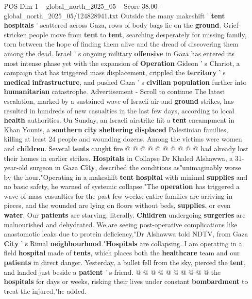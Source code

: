 \begin{textsample}{POS Dim 1 – global\_north\_2025\_05 – Score 38.00 – global\_north\_2025\_05/124828941.txt}  \label{ex:f1_pos_212}
Outside the many makeshift ' \textbf{tent} \textbf{hospitals} ' scattered across Gaza, rows of body bags lie on the \textbf{ground}.
Grief-stricken people move from \textbf{tent} to \textbf{tent}, searching desperately for missing family, torn between the hope of finding them alive and the dread of discovering them among the dead.
Israel ' s ongoing military \textbf{offensive} in Gaza has entered its most intense phase yet with the expansion of \textbf{Operation} Gideon ' s Chariot, a campaign that has triggered mass displacement, crippled the \textbf{territory} ' s \textbf{medical} \textbf{infrastructure}, and pushed Gaza ' s \textbf{civilian} \textbf{population} further into \textbf{humanitarian} catastrophe.
Advertisement - Scroll to continue The latest escalation, marked by a sustained wave of Israeli air and \textbf{ground} strikes, has resulted in hundreds of new casualties in the last few days, according to local \textbf{health} authorities.
On Sunday, an Israeli airstrike hit a \textbf{tent} encampment in Khan Younis, a \textbf{southern} \textbf{city} \textbf{sheltering} \textbf{displaced} Palestinian families, killing at least 24 people and wounding dozens.
Among the victims were women and \textbf{children}.
Several \textbf{tents} caught fire @ @ @ @ @ @ @ @ @ @ had already lost their homes in earlier strikes. \textbf{Hospitals} in Collapse Dr Khaled Alshawwa, a 31-year-old surgeon in Gaza \textbf{City}, described the conditions as"unimaginably worse by the hour."Operating in a makeshift \textbf{tent} \textbf{hospital} with minimal \textbf{supplies} and no basic safety, he warned of systemic collapse."The \textbf{operation} has triggered a wave of mass casualties for the past few weeks, entire families are arriving in pieces, and the wounded are lying on floors without beds, \textbf{supplies}, or even \textbf{water}.
Our \textbf{patients} are starving, literally. \textbf{Children} undergoing \textbf{surgeries} are malnourished and dehydrated.
We are seeing post-operative complications like anastomotic leaks due to protein deficiency,"Dr Alshawwa told NDTV, from Gaza \textbf{City} ' s Rimal \textbf{neighbourhood}."\textbf{Hospitals} are collapsing.
I am operating in a field \textbf{hospital} made of \textbf{tents}, which places both the \textbf{healthcare} team and our \textbf{patients} in direct danger.
Yesterday, a bullet fell from the sky, pierced the \textbf{tent}, and landed just beside a \textbf{patient} ' s friend. @ @ @ @ @ @ @ @ @ @ the \textbf{hospitals} for days or weeks, risking their lives under constant \textbf{bombardment} to treat the injured,"he added.

\end{textsample}
